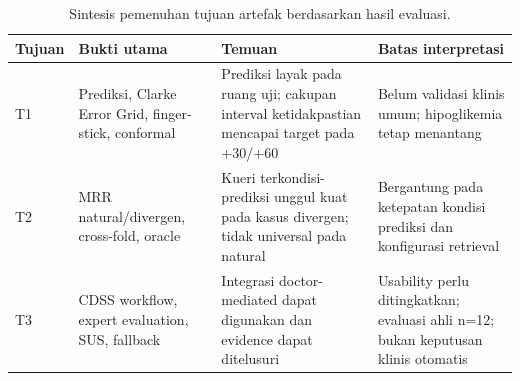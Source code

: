 \begin{table}[!htbp]
\centering
\caption{Sintesis pemenuhan tujuan artefak berdasarkan hasil evaluasi.}
\label{tab:tab6.20_sintesis_pemenuhan_tujuan}
    \begin{tabularx}{\textwidth}{@{}p{}L L L@{}}
    \hline
    \textbf{Tujuan} & \textbf{Bukti utama} & \textbf{Temuan} & \textbf{Batas interpretasi} \\
    \hline
    T1 & Prediksi, Clarke Error Grid, finger-stick, conformal & Prediksi layak pada ruang uji; cakupan interval ketidakpastian mencapai target pada +30/+60 & Belum validasi klinis umum; hipoglikemia tetap menantang \\
    T2 & MRR natural/divergen, cross-fold, oracle & Kueri terkondisi-prediksi unggul kuat pada kasus divergen; tidak universal pada natural & Bergantung pada ketepatan kondisi prediksi dan konfigurasi retrieval \\
    T3 & CDSS workflow, expert evaluation, SUS, fallback & Integrasi doctor-mediated dapat digunakan dan evidence dapat ditelusuri & Usability perlu ditingkatkan; evaluasi ahli n=12; bukan keputusan klinis otomatis \\
    \hline
    \end{tabularx}
\end{table}
